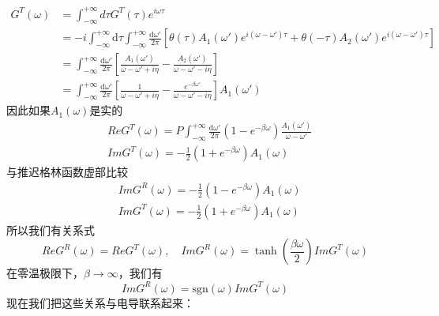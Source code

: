 \documentclass{article}
\numberwithin{equation}{subsection}
\begin{document}
\begin{equation}
    \begin{split}
        G^T(\omega)&=\int_{-\infty}^{+\infty}d\tau G^T(\tau)e^{i\omega\tau}\\
        &=-i\int_{-\infty}^{+\infty}\mathrm{d}\tau\int_{-\infty}^{+\infty}\frac{\mathrm{d}\omega'}{2\pi}\left[\theta(\tau)A_1(\omega')e^{i(\omega-\omega')\tau}+\theta(-\tau)A_2(\omega')e^{i(\omega-\omega')\tau}\right]\\
        &=\int_{-\infty}^{+\infty}\frac{\mathrm{d}\omega'}{2\pi}\left[\frac{A_1(\omega')}{\omega-\omega'+i\eta}-\frac{A_2(\omega')}{\omega-\omega'-i\eta}\right]\\
        &=\int_{-\infty}^{+\infty}\frac{\mathrm{d}\omega'}{2\pi}\left[\frac{1}{\omega-\omega'+i\eta}-\frac{e^{-\beta\omega'}}{\omega-\omega'-i\eta}\right]A_1(\omega')
    \end{split}
\end{equation}
因此如果$A_1(\omega)$是实的
\begin{equation}
    \begin{split}
        &ReG^T(\omega)=P\int_{-\infty}^{+\infty}\frac{\mathrm{d}\omega'}{2\pi}(1-e^{-\beta\omega})\frac{A_1(\omega')}{\omega-\omega'}\\
        &ImG^T(\omega)=-\frac{1}{2}(1+e^{-\beta\omega})A_1(\omega)
    \end{split}
\end{equation}
与推迟格林函数虚部比较
\begin{equation}
    \begin{split}
        &ImG^R(\omega)=-\frac{1}{2}(1-e^{-\beta\omega})A_1(\omega)\\
        &ImG^T(\omega)=-\frac{1}{2}(1+e^{-\beta\omega})A_1(\omega)
    \end{split}
\end{equation}
所以我们有关系式
\begin{equation}
    ReG^R(\omega)=ReG^T(\omega),\quad ImG^R(\omega)=\tanh(\frac{\beta\omega}{2})ImG^T(\omega)
\end{equation}
在零温极限下，$\beta\to\infty$，我们有
\begin{equation}
    ImG^R(\omega)=\mathrm{sgn}(\omega)ImG^T(\omega)
\end{equation}
现在我们把这些关系与电导联系起来：
\end{document}
